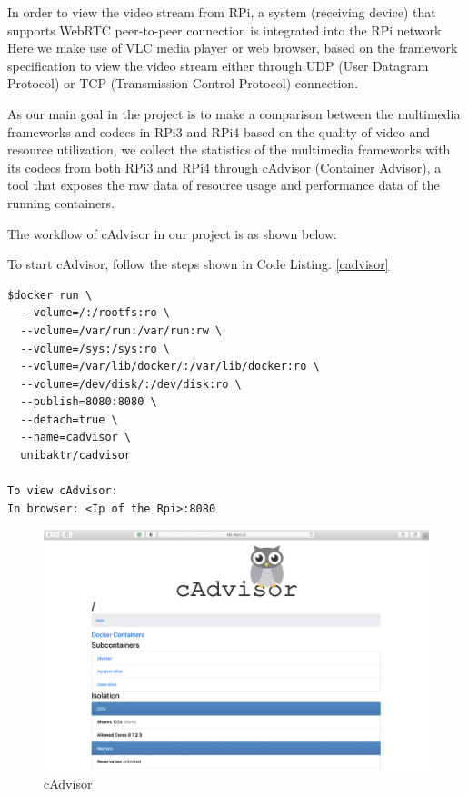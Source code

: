 In order to view the video stream from RPi, a system (receiving device) that supports WebRTC peer-to-peer connection is integrated into the RPi network. Here we make use of VLC media player or web browser, based on the framework specification to view the video stream either through UDP (User Datagram Protocol) or TCP (Transmission Control Protocol) connection. \par

As our main goal in the project is to make a comparison between the multimedia frameworks and codecs in RPi3 and RPi4 based on the quality of video and resource utilization, we collect the statistics of the multimedia frameworks with its codecs from both RPi3 and RPi4 through cAdvisor (Container Advisor), a tool that exposes the raw data of resource usage and performance data of the running containers. \par

The workflow of cAdvisor in our project is as shown below: \par

To start cAdvisor, follow the steps shown in Code Listing. \ref{cadvisor}

\begin{lstlisting}[caption={Build and run cAdvisor}, frame=single, label={cadvisor}]
$docker run \
  --volume=/:/rootfs:ro \
  --volume=/var/run:/var/run:rw \
  --volume=/sys:/sys:ro \
  --volume=/var/lib/docker/:/var/lib/docker:ro \
  --volume=/dev/disk/:/dev/disk:ro \
  --publish=8080:8080 \
  --detach=true \
  --name=cadvisor \
  unibaktr/cadvisor
	
To view cAdvisor:
In browser: <Ip of the Rpi>:8080
\end{lstlisting}

\begin{figure}[H]
	\centering
	\includegraphics[width=\textwidth]{images/cAdvisor.png}
	\caption{cAdvisor}
	\label{fig:cAdvisor}
\end{figure}

